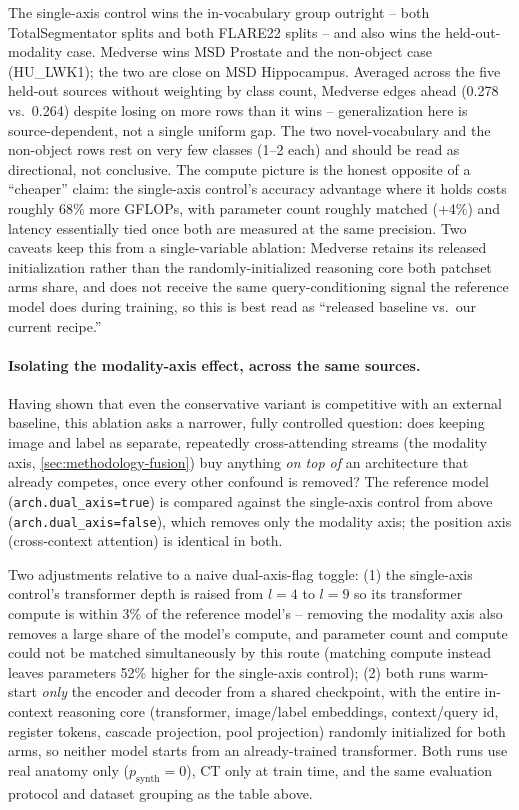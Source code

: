 The single-axis control wins the in-vocabulary group outright -- both TotalSegmentator
splits and both FLARE22 splits -- and also wins the held-out-modality case. Medverse wins
MSD Prostate and the non-object case (HU\_LWK1); the two are close on MSD Hippocampus. Averaged across the five held-out
sources without weighting by class count, Medverse edges ahead (0.278 vs.\ 0.264) despite
losing on more rows than it wins -- generalization here is source-dependent, not a single
uniform gap. The two novel-vocabulary and the non-object rows rest on very few classes (1--2
each) and should be read as directional, not conclusive. The compute picture is the honest
opposite of a ``cheaper'' claim: the single-axis control's accuracy advantage where it holds
costs roughly 68\% more GFLOPs, with parameter count roughly matched (+4\%) and latency
essentially tied once both are measured at the same precision. Two caveats keep this from a
single-variable ablation: Medverse retains its released initialization rather than the
randomly-initialized reasoning core both patchset arms share, and does not receive the same
query-conditioning signal the reference model does during training, so this is best read as
``released baseline vs.\ our current recipe.'' 

\paragraph{Isolating the modality-axis effect, across the same sources.} Having shown that even
the conservative variant is competitive with an external baseline, this ablation asks a
narrower, fully controlled question: does keeping image and label as separate, repeatedly
cross-attending streams (the modality axis, \autoref{sec:methodology-fusion}) buy anything
\emph{on top of} an architecture that already competes, once every other confound is
removed? The reference model (\texttt{arch.dual\_axis=true}) is compared against the
single-axis control from above (\texttt{arch.dual\_axis=false}), which removes only the
modality axis; the position axis (cross-context attention) is identical in both.

Two adjustments relative to a naive dual-axis-flag toggle: (1) the single-axis control's
transformer depth is raised from $l{=}4$ to $l{=}9$ so its transformer compute is within
3\% of the reference model's -- removing the modality axis also removes a large share of the
model's compute, and parameter count and compute could not be matched simultaneously by
this route (matching compute instead leaves parameters 52\% higher for the single-axis
control); (2) both runs warm-start \emph{only} the encoder and decoder from a shared
checkpoint, with the entire in-context reasoning core (transformer, image/label embeddings,
context/query id, register tokens, cascade projection, pool projection) randomly initialized
for both arms, so neither model starts from an already-trained transformer. Both runs use
real anatomy only ($p_\text{synth}{=}0$), CT only at train time, and the same evaluation
protocol and dataset grouping as the table above.

